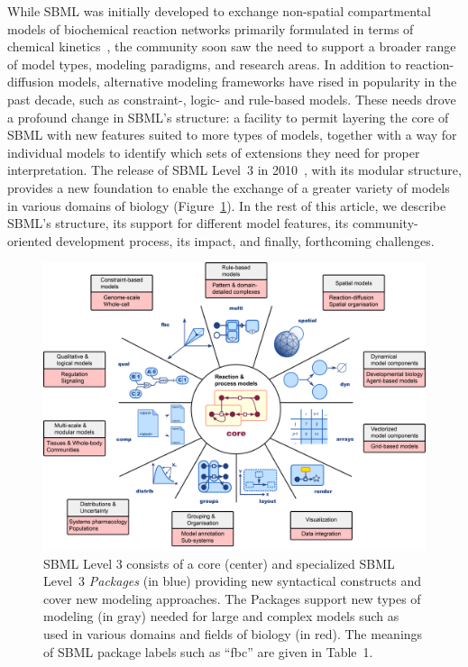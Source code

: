 \documentclass[]{draft-sbml-paper}
\begin{document}
While SBML was initially developed to exchange non-spatial compartmental models of biochemical reaction networks primarily formulated in terms of chemical kinetics~\citep{hucka_2002}, the community soon saw the need to support a broader range of model types, modeling paradigms, and research areas. In addition to reaction-diffusion models, alternative modeling frameworks have rised in popularity in the past decade, such as constraint-, logic- and rule-based models. These needs drove a profound change in SBML's structure: a facility to permit layering the core of SBML with new features suited to more types of models, together with a way for individual models to identify which sets of extensions they need for proper interpretation. The release of SBML Level~3 in 2010~\citep{Hucka2015}, with its modular structure, provides a new foundation to enable the exchange of a greater variety of models in various domains of biology (Figure~\ref{level-3-diagram}). In the rest of this article, we describe SBML's structure, its support for different model features, its community-oriented development process, its impact, and finally, forthcoming challenges.

\begin{figure}[b]
  \center
  \includegraphics[width=\textwidth]{res/SBML-Level3-v08.png}
\caption{SBML Level 3 consists of a core (center) and specialized SBML Level~3 \emph{Packages} (in blue) providing new syntactical constructs and cover new modeling approaches. The Packages support new types of modeling (in gray) needed for large and complex models such as used in various domains and fields of biology (in red). The meanings of SBML package labels such as ``fbc'' are given in Table~1.}
\label{level-3-diagram}
\end{figure}
\end{document}
